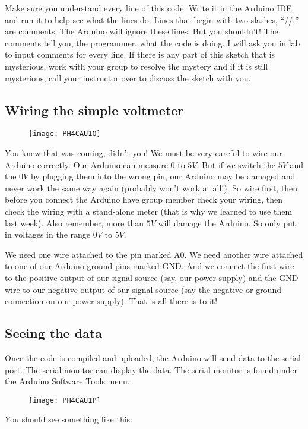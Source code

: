 Make sure you understand every line of this code. Write it in the Arduino IDE and run it to help see what the lines do. Lines that begin with two slashes, ``//,'' are comments. The Arduino will ignore these lines. But you shouldn't! The comments tell you, the programmer, what the code is doing. I will ask you in lab to input comments
for every line. If there is any part of this sketch that is mysterious, work with your group to resolve the mystery and if it is still mysterious, call your instructor over to discuss the sketch with you.

\subsection{Wiring the simple voltmeter}

\begin{figure}[h!]
	\centering
	\texttt{[image: PH4CAU1O]}
\end{figure}
You knew that was coming, didn't you! We must be very careful to wire our Arduino correctly. Our Arduino can measure $0$ to $5\unit{V}.$ But if we switch the $5\unit{V}$ and the $0\unit{V}$ by plugging them into the wrong pin, our Arduino may be damaged and never work the same way again (probably won't work at all!). So wire
first, then before you connect the Arduino have group member check your wiring, then check the wiring with a stand-alone meter (that is why we learned to use them last week). Also remember, more than $5\unit{V}$ will damage the Arduino. So only put in voltages in the range $0\unit{V}$ to $5 \unit{V}.$

We need one wire attached to the pin marked A0. We need another wire
attached to one of our Arduino ground pins marked GND. And we connect the
first wire to the positive output of our signal source (say, our power
supply) and the GND wire to our negative output of our signal source (say
the negative or ground connection on our power supply). That is all there is
to it!

\subsection{Seeing the data}

Once the code is compiled and uploaded, the Arduino will send data to the
serial port. The serial monitor can display the data. The serial monitor is
found under the Arduino Software Tools menu.

\begin{figure}[h!]
	\centering
	\texttt{[image: PH4CAU1P]}
\end{figure}
You should see something like this:

